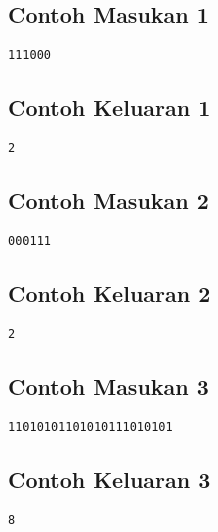 \documentclass{article}
\begin{document}
\begin{multicols}{2}
\subsection*{Contoh Masukan 1}
\begin{lstlisting}
111000
\end{lstlisting}
\null
\columnbreak
\subsection*{Contoh Keluaran 1}
\begin{lstlisting}
2
\end{lstlisting}
\vfill
\null
\end{multicols}

\begin{multicols}{2}
\subsection*{Contoh Masukan 2}
\begin{lstlisting}
000111
\end{lstlisting}
\null
\columnbreak
\subsection*{Contoh Keluaran 2}
\begin{lstlisting}
2
\end{lstlisting}
\vfill
\null
\end{multicols}

\begin{multicols}{2}
\subsection*{Contoh Masukan 3}
\begin{lstlisting}
11010101101010111010101
\end{lstlisting}
\null
\columnbreak
\subsection*{Contoh Keluaran 3}
\begin{lstlisting}
8
\end{lstlisting}
\vfill
\null
\end{multicols}

\pagebreak
\end{document}
